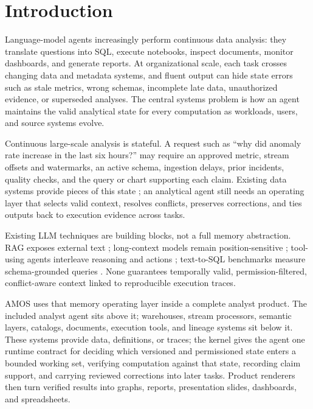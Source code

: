 \documentclass[10pt]{article}
\newcommand{\amos}{\textsc{AMOS}\xspace}
\begin{document}
\section{Introduction}

Language-model agents increasingly perform continuous data analysis: they translate questions into SQL, execute notebooks, inspect documents, monitor dashboards, and generate reports. At organizational scale, each task crosses changing data and metadata systems, and fluent output can hide state errors such as stale metrics, wrong schemas, incomplete late data, unauthorized evidence, or superseded analyses. The central systems problem is how an agent maintains the valid analytical state for every computation as workloads, users, and source systems evolve.

Continuous large-scale analysis is stateful. A request such as ``why did anomaly rate increase in the last six hours?'' may require an approved metric, stream offsets and watermarks, an active schema, ingestion delays, prior incidents, quality checks, and the query or chart supporting each claim. Existing data systems provide pieces of this state \cite{millwheel,dataflow,flink,deltalake,openlineage,provdm}; an analytical agent still needs an operating layer that selects valid context, resolves conflicts, preserves corrections, and ties outputs back to execution evidence across tasks.

Existing LLM techniques are building blocks, not a full memory abstraction. RAG exposes external text \cite{rag}; long-context models remain position-sensitive \cite{lostinthemiddle}; tool-using agents interleave reasoning and actions \cite{react,toolformer}; text-to-SQL benchmarks measure schema-grounded queries \cite{spider,bird,spider2}. None guarantees temporally valid, permission-filtered, conflict-aware context linked to reproducible execution traces.

\amos uses that memory operating layer inside a complete analyst product. The included analyst agent sits above it; warehouses, stream processors, semantic layers, catalogs, documents, execution tools, and lineage systems sit below it. These systems provide data, definitions, or traces; the kernel gives the agent one runtime contract for deciding which versioned and permissioned state enters a bounded working set, verifying computation against that state, recording claim support, and carrying reviewed corrections into later tasks. Product renderers then turn verified results into graphs, reports, presentation slides, dashboards, and spreadsheets.
\end{document}
